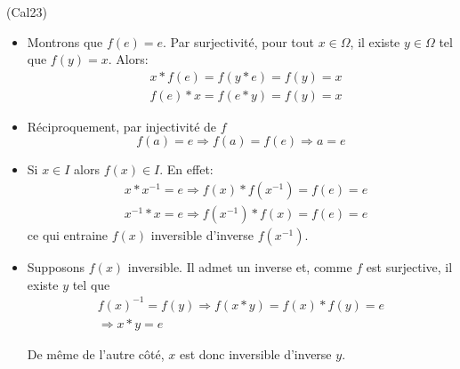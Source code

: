 \begin{tiny}(Cal23)\end{tiny}
\begin{itemize}
  \item Montrons que $f(e)=e$. Par surjectivité, pour tout $x\in \Omega$, il existe $y\in \Omega$ tel que $f(y)=x$. Alors: 
\begin{displaymath}
\begin{aligned}
&x*f(e) = f(y*e) = f(y) = x \\
&f(e) * x = f(e*y) = f(y) =x  
\end{aligned}
\end{displaymath}
  \item Réciproquement, par injectivité de $f$
\begin{displaymath}
  f(a)=e \Rightarrow f(a)=f(e) \Rightarrow a = e
\end{displaymath}
  \item Si $x\in I$ alors $f(x)\in I$. En effet:
\begin{displaymath}
\begin{aligned}
  &x*x^{-1} = e \Rightarrow f(x) * f(x^{-1})=f(e)=e\\
  &x^{-1}*x = e \Rightarrow f(x^{-1}) * f(x)=f(e)=e
\end{aligned}
\end{displaymath}
ce qui entraine $f(x)$ inversible d'inverse $f(x^{-1})$.
\item Supposons $f(x)$ inversible. Il admet un inverse et, comme $f$ est surjective, il existe $y$ tel que
\begin{multline*}
  f(x)^{-1} = f(y)
\Rightarrow f(x*y) = f(x)*f(y) = e\\
\Rightarrow x*y = e
\end{multline*}

De même de l'autre côté, $x$ est donc inversible d'inverse $y$.
\end{itemize}
